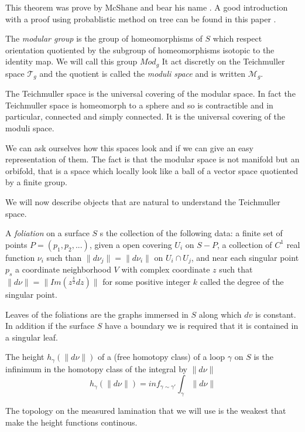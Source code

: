 This theorem was prove by McShane and bear his name \cite{Mcshane95simplegeodesics}. A good introduction with a proof using probablistic method on tree can be found in this paper \cite{labourie:hal-01654564}.

\begin{dfnt}
The \emph{modular group} is the group of homeomorphisms of $S$ which respect orientation quotiented by the subgroup of homeomorphisms isotopic to the identity map. We will call this group $Mod_g$
It act discretly on the Teichmuller space $\mathcal{T}_g$ and the quotient is called the \emph{moduli space} and is written $\mathcal{M}_g$.
\end{dfnt}

The Teichmuller space is the universal covering of the modular space. In fact the Teichmuller space is homeomorph to a sphere and so is contractible and in particular, connected and simply connected. It is the universal covering of the moduli space.

We can ask ourselves how this spaces look and if we can give an easy representation of them. The fact is that the modular space is not manifold but an orbifold, that is a space which locally look like a ball of a vector space quotiented by a finite group.

We will now describe objects that are natural to understand the Teichmuller space.

\begin{dfnt}
A \emph{foliation} on a surface $S$ s the collection of the following data: a finite set of points $P=(p_1,p_2,...)$, given a open covering $U_i$ on $S-P$, a collection of $C^1$
 real function $\nu_i$ such than $\| d \nu_j \| = \| d \nu_i \|$  on $U_i \cap U_j$,
 and near each singular point $p_s$ a coordinate neighborhood $V$ with complex coordinate $z$ such that $\| d \nu \| = \| Im(z^{\frac{k}{2}}dz) \|$ for some positive integer $k$ called the degree of the singular point.

 Leaves of the foliations are the graphs immersed in $S$ along which $dv$ is constant. In addition if the surface $S$  have a boundary we is required that it is contained in a singular leaf.
\end{dfnt}

The height $h_\gamma(\| d \nu \|)$ of a (free homotopy class) of a loop $\gamma$ on $S$ is the infinimum in the homotopy class of the integral by $\| d \nu \|$
\[
h_\gamma(\| d \nu \|)=inf_{\gamma \sim \gamma'} \int_{\gamma} \| d \nu \|
\]

The topology on the measured lamination that we will use is the weakest that make the height functions continous.

